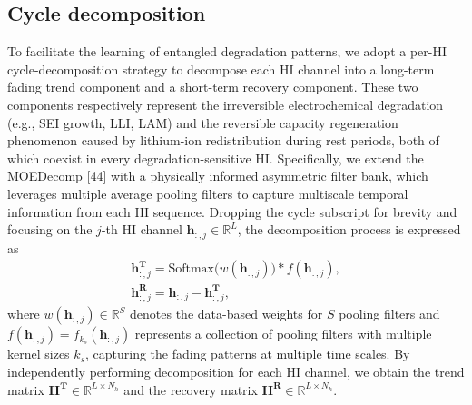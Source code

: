 \documentclass[preprint,12pt]{elsarticle}
\begin{document}
\subsection{Cycle decomposition}
To facilitate the learning of entangled degradation patterns, we adopt a per-HI cycle-decomposition strategy to decompose each HI channel into a long-term fading trend component and a short-term recovery component. These two components respectively represent the irreversible electrochemical degradation (e.g., SEI growth, LLI, LAM) and the reversible capacity regeneration phenomenon caused by lithium-ion redistribution during rest periods, both of which coexist in every degradation-sensitive HI. Specifically, we extend the MOEDecomp [44] with a physically informed asymmetric filter bank, which leverages multiple average pooling filters to capture multiscale temporal information from each HI sequence. Dropping the cycle subscript for brevity and focusing on the $j$-th HI channel $\mathbf{h}_{:,j} \in \mathbb{R}^{L}$, the decomposition process is expressed as
\begin{gather}
\mathbf{h}_{:,j}^{\mathbf{T}} = \text{Softmax}\bigl(w(\mathbf{h}_{:,j})\bigr) * f(\mathbf{h}_{:,j}),  \\
\mathbf{h}_{:,j}^{\mathbf{R}} = \mathbf{h}_{:,j} - \mathbf{h}_{:,j}^{\mathbf{T}},
\end{gather}
where $w(\mathbf{h}_{:,j}) \in \mathbb{R}^{S}$ denotes the data-based weights for $S$ pooling filters and $f(\mathbf{h}_{:,j}) = f_{k_s}(\mathbf{h}_{:,j})$ represents a collection of pooling filters with multiple kernel sizes ${k_s}$, capturing the fading patterns at multiple time scales. By independently performing decomposition for each HI channel, we obtain the trend matrix $\mathbf{H}^{\mathbf{T}} \in \mathbb{R}^{L \times N_h}$ and the recovery matrix $\mathbf{H}^{\mathbf{R}} \in \mathbb{R}^{L \times N_h}$.
\end{document}
